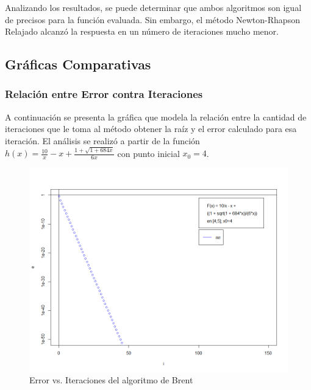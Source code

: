 \documentclass[a4paper,12pt]{article}
\begin{document}
Analizando los resultados, se puede determinar que ambos algoritmos son igual de precisos para la función evaluada. Sin embargo, el método Newton-Rhapson Relajado alcanzó la respuesta en un número de iteraciones mucho menor. \par

\newpage 

\subsection{Gráficas Comparativas}

\subsubsection{Relación entre Error contra Iteraciones}

A continuación se presenta la gráfica que modela la relación entre la cantidad de iteraciones que le toma al método obtener la raíz y el error calculado para esa iteración. El análisis se realizó a partir de la función $h(x)=\frac{10}{x}-x +\frac{1 + \sqrt{1 + 684 x}}{6x}$ con punto inicial $x_0 = 4$. \par

\vspace{-1em}
\begin{figure}[ht!]
\centering
\includegraphics[scale=0.4]{img/nrr_e_vs_i.png}
\vspace{-1em}
\caption{Error vs. Iteraciones del algoritmo de Brent}
\label{fig:nrr_e_vs_i}
\end{figure}
\end{document}
